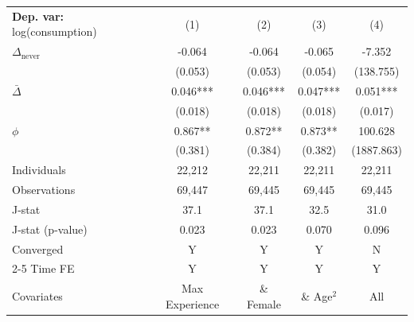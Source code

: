 \begin{tabular}{l cccc} \toprule  \textbf{Dep. var:}  log(consumption) 
                    &\multicolumn{1}{c}{(1)}   &\multicolumn{1}{c}{(2)}   &\multicolumn{1}{c}{(3)}   &\multicolumn{1}{c}{(4)}   \\

\addlinespace
$\Delta_{\text{never}}$&      -0.064   &      -0.064   &      -0.065   &      -7.352   \\
                    &     (0.053)   &     (0.053)   &     (0.054)   &   (138.755)   \\

\addlinespace
$\bar{\Delta}$      &       0.046***&       0.046***&       0.047***&       0.051***\\
                    &     (0.018)   &     (0.018)   &     (0.018)   &     (0.017)   \\

\addlinespace
$\phi$              &       0.867** &       0.872** &       0.873** &     100.628   \\
                    &     (0.381)   &     (0.384)   &     (0.382)   &  (1887.863)   \\
\addlinespace
Individuals         &      22,212   &      22,211   &      22,211   &      22,211   \\
Observations        &      69,447   &      69,445   &      69,445   &      69,445   \\
J-stat              &        37.1   &        37.1   &        32.5   &        31.0   \\
J-stat (p-value)    &       0.023   &       0.023   &       0.070   &       0.096   \\
Converged           &           Y   &           Y   &           Y   &           N   \\
\cmidrule{2-5} Time FE & Y & Y & Y & Y \\ Covariates & Max Experience & \& Female & \& Age$^2$ & All \\ \bottomrule \end{tabular}

